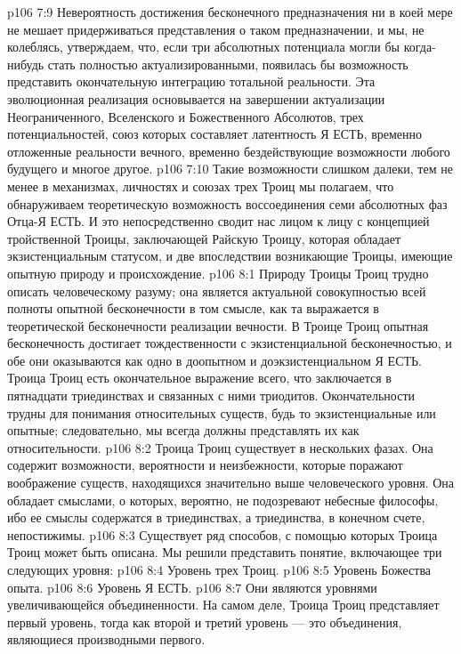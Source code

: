\vs p106 7:9 \pc Невероятность достижения бесконечного предназначения ни в коей мере не мешает придерживаться представления о таком предназначении, и мы, не колеблясь, утверждаем, что, если три абсолютных потенциала могли бы когда\hyp{}нибудь стать полностью актуализированными, появилась бы возможность представить окончательную интеграцию тотальной реальности. Эта эволюционная реализация основывается на завершении актуализации Неограниченного, Вселенского и Божественного Абсолютов, трех потенциальностей, союз которых составляет латентность Я ЕСТЬ, временно отложенные реальности вечного, временно бездействующие возможности любого будущего и многое другое.
\vs p106 7:10 Такие возможности слишком далеки, тем не менее в механизмах, личностях и союзах трех Троиц мы полагаем, что обнаруживаем теоретическую возможность воссоединения семи абсолютных фаз Отца\hyp{}Я ЕСТЬ. И это непосредственно сводит нас лицом к лицу с концепцией тройственной Троицы, заключающей Райскую Троицу, которая обладает экзистенциальным статусом, и две впоследствии возникающие Троицы, имеющие опытную природу и происхождение.
\vs p106 8:1 Природу Троицы Троиц трудно описать человеческому разуму; она является актуальной совокупностью всей полноты опытной бесконечности в том смысле, как та выражается в теоретической бесконечности реализации вечности. В Троице Троиц опытная бесконечность достигает тождественности с экзистенциальной бесконечностью, и обе они оказываются как одно в доопытном и доэкзистенциальном Я ЕСТЬ. Троица Троиц есть окончательное выражение всего, что заключается в пятнадцати триединствах и связанных с ними триодитов. Окончательности трудны для понимания относительных существ, будь то экзистенциальные или опытные; следовательно, мы всегда должны представлять их как относительности.
\vs p106 8:2 Троица Троиц существует в нескольких фазах. Она содержит возможности, вероятности и неизбежности, которые поражают воображение существ, находящихся значительно выше человеческого уровня. Она обладает смыслами, о которых, вероятно, не подозревают небесные философы, ибо ее смыслы содержатся в триединствах, а триединства, в конечном счете, непостижимы.
\vs p106 8:3 Существует ряд способов, с помощью которых Троица Троиц может быть описана. Мы решили представить понятие, включающее три следующих уровня:
\vs p106 8:4 \bibnobreakspace Уровень трех Троиц.
\vs p106 8:5 \bibnobreakspace Уровень Божества опыта.
\vs p106 8:6 \bibnobreakspace Уровень Я ЕСТЬ.
\vs p106 8:7 \pc Они являются уровнями увеличивающейся объединенности. На самом деле, Троица Троиц представляет первый уровень, тогда как второй и третий уровень --- это объединения, являющиеся производными первого.
